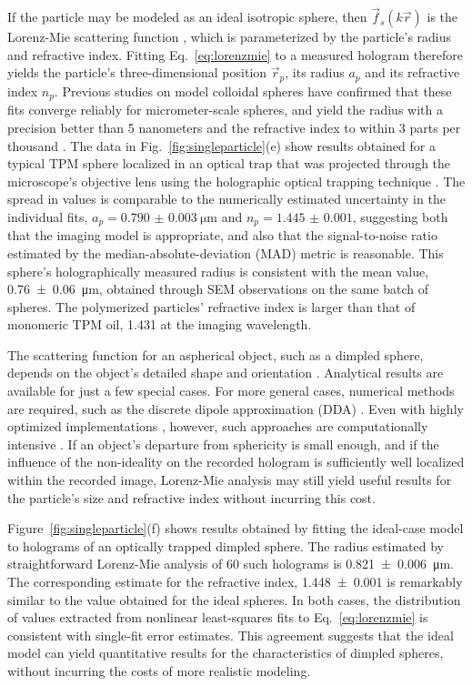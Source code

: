 If the particle may be modeled as
an ideal isotropic sphere, then $\vec{f}_s(k\vec{r})$ is
the Lorenz-Mie scattering function \cite{bohren83,mishchenko02},
which is parameterized by the particle's radius and refractive index.
Fitting Eq.~\eqref{eq:lorenzmie} to a measured hologram
therefore yields the particle's three-dimensional position $\vec{r}_p$,
its radius $a_p$ and its refractive index $n_p$.
Previous studies on model colloidal spheres have confirmed that
these fits converge reliably for micrometer-scale spheres, and yield
the radius with a precision better than 5 nanometers 
\cite{lee07a,moyses13,krishnatreya14}
and the refractive index to within 3 parts per thousand 
\cite{shpaisman12,moyses13}.
The data in Fig.~\ref{fig:singleparticle}(e) show results obtained for
a typical TPM sphere localized in an optical trap that was
projected through the microscope's objective lens using the
holographic optical trapping technique \cite{dufresne98,*grier03}.
The spread in values is comparable to the numerically
estimated uncertainty in the individual fits,
$a_p = \SI{0.790(3)}{\um}$ and $n_p = \num{1.445(1)}$,
suggesting both that
the imaging model is appropriate, and also that the signal-to-noise
ratio estimated by the median-absolute-deviation (MAD) metric
is reasonable.
This sphere's holographically measured radius is consistent with the 
mean value, \SI{0.76(6)}{\um}, obtained through SEM observations 
on the same batch of spheres.
The polymerized particles' refractive index is larger 
than that of monomeric TPM oil, \num{1.431} at the imaging wavelength.

The scattering function for an aspherical object, 
such as a dimpled sphere, depends on the object's detailed shape
and orientation \cite{mishchenko02}.
Analytical results are available for just a few special cases.
For more general cases, numerical methods are required, 
such as the discrete dipole approximation (DDA) \cite{draine94}. 
Even with highly optimized implementations \cite{yurkin11}, however,
such approaches are computationally intensive \cite{fung12,*perry12,*wang14using}.
If an object's departure from sphericity is small enough, and if the
influence of the non-ideality on the recorded hologram is sufficiently well
localized within the recorded image, Lorenz-Mie analysis
may still yield useful results for the particle's
size and refractive index without incurring this cost.

Figure~\ref{fig:singleparticle}(f) shows results obtained by fitting the
ideal-case model to holograms of an optically trapped dimpled sphere.
The radius estimated by straightforward 
Lorenz-Mie analysis of \num{60} such holograms
is \SI{0.821(6)}{\um}.
The corresponding estimate for the refractive index,
\num{1.448(1)} is remarkably similar to the value obtained for the
ideal spheres.
In both cases, the distribution of
values extracted from nonlinear least-squares 
fits to Eq.~\eqref{eq:lorenzmie} is consistent with single-fit error estimates.
This agreement suggests that the ideal model can yield quantitative
results for the characteristics of dimpled spheres, without incurring
the costs of more realistic modeling.

